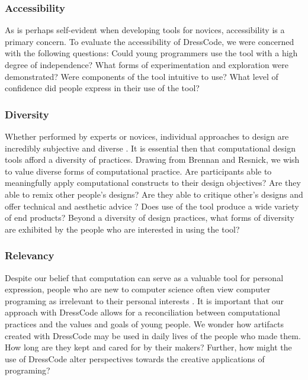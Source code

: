 \documentclass{sigchi}
\begin{document}
\subsubsection{Accessibility}
 As is perhaps self-evident when developing tools for novices, accessibility is a primary concern. To evaluate the accessibility of DressCode, we were concerned with the following questions: Could young programmers use the tool with a high degree of independence? What forms of experimentation and exploration were demonstrated? Were components of the tool intuitive to use? What level of confidence did people express in their use of the tool?

\subsubsection{Diversity}
 Whether performed by experts or novices, individual approaches to design are incredibly subjective and diverse \cite{learning_in_design}. It is essential then that computational design tools afford a diversity of practices. Drawing from Brennan and Resnick, we wish to value diverse forms of computational practice. Are participants able to meaningfully apply computational constructs to their design objectives? Are they able to remix other people's designs? Are they able to critique other's designs and offer technical and aesthetic advice \cite{computational_thinking}? Does use of the tool produce a wide variety of end products? Beyond a diversity of design practices, what forms of diversity are exhibited by the people who are interested in using the tool? %

\subsubsection{Relevancy}
 Despite our belief that computation can serve as a valuable tool for personal expression, people who are new to computer science often view computer programing as irrelevant to their personal interests \cite{introductory_programming}. It is important that our approach with DressCode allows for a reconciliation between computational practices and the values and goals of young people. We wonder how artifacts created with DressCode may be used in daily lives of the people who made them. How long are they kept and cared for by their makers? Further, how might the use of DressCode alter perspectives towards the creative applications of programing?
\end{document}
